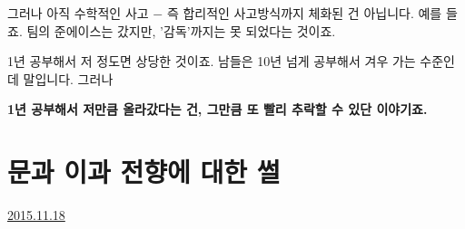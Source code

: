 그러나 아직 수학적인 사고 $-$ 즉 합리적인 사고방식까지 체화된 건 아닙니다.
예를 들죠. 팀의 준에이스는 갔지만, '감독'까지는 못 되었다는 것이죠.
\vspace{5mm}

1년 공부해서 저 정도면 상당한 것이죠. 남들은 10년 넘게 공부해서 겨우 가는 수준인데 말입니다.
그러나
\vspace{5mm}

\textbf{1년 공부해서 저만큼 올라갔다는 건, 그만큼 또 빨리 추락할 수 있단 이야기죠.}
\vspace{5mm}






\section{문과 이과 전향에 대한 썰}
\href{https://www.kockoc.com/Apoc/499454}{2015.11.18}

\vspace{5mm}

